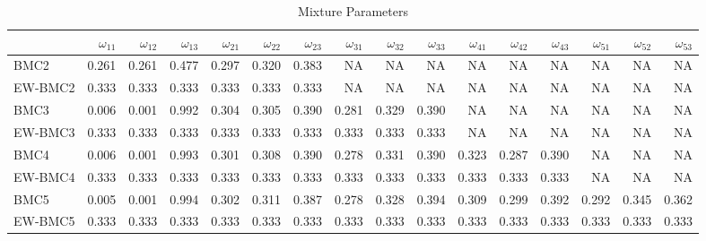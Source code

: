 \documentclass[
]{article}
\begin{document}
\begin{table}[H]

\caption{\label{tab:unnamed-chunk-5}Mixture Parameters}
\centering
\fontsize{8}{10}\selectfont
\begin{tabular}[t]{lrrrrrrrrrrrrrrr}
\toprule
  & $\omega_{11}$ & $\omega_{12}$ & $\omega_{13}$ & $\omega_{21}$ & $\omega_{22}$ & $\omega_{23}$ & $\omega_{31}$ & $\omega_{32}$ & $\omega_{33}$ & $\omega_{41}$ & $\omega_{42}$ & $\omega_{43}$ & $\omega_{51}$ & $\omega_{52}$ & $\omega_{53}$\\
\midrule
BMC2 & 0.261 & 0.261 & 0.477 & 0.297 & 0.320 & 0.383 & NA & NA & NA & NA & NA & NA & NA & NA & NA\\
EW-BMC2 & 0.333 & 0.333 & 0.333 & 0.333 & 0.333 & 0.333 & NA & NA & NA & NA & NA & NA & NA & NA & NA\\
BMC3 & 0.006 & 0.001 & 0.992 & 0.304 & 0.305 & 0.390 & 0.281 & 0.329 & 0.390 & NA & NA & NA & NA & NA & NA\\
EW-BMC3 & 0.333 & 0.333 & 0.333 & 0.333 & 0.333 & 0.333 & 0.333 & 0.333 & 0.333 & NA & NA & NA & NA & NA & NA\\
BMC4 & 0.006 & 0.001 & 0.993 & 0.301 & 0.308 & 0.390 & 0.278 & 0.331 & 0.390 & 0.323 & 0.287 & 0.390 & NA & NA & NA\\
\addlinespace
EW-BMC4 & 0.333 & 0.333 & 0.333 & 0.333 & 0.333 & 0.333 & 0.333 & 0.333 & 0.333 & 0.333 & 0.333 & 0.333 & NA & NA & NA\\
BMC5 & 0.005 & 0.001 & 0.994 & 0.302 & 0.311 & 0.387 & 0.278 & 0.328 & 0.394 & 0.309 & 0.299 & 0.392 & 0.292 & 0.345 & 0.362\\
EW-BMC5 & 0.333 & 0.333 & 0.333 & 0.333 & 0.333 & 0.333 & 0.333 & 0.333 & 0.333 & 0.333 & 0.333 & 0.333 & 0.333 & 0.333 & 0.333\\
\bottomrule
\end{tabular}
\end{table}
\end{document}
